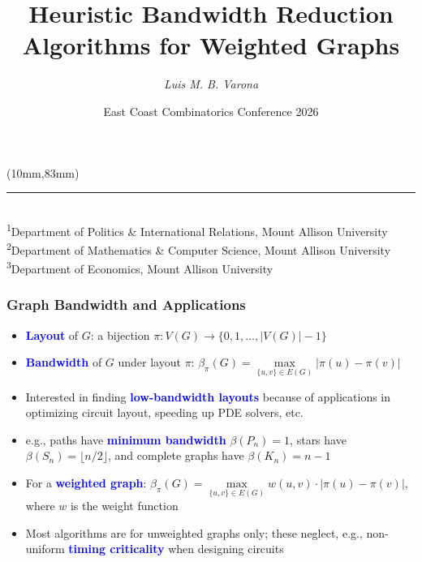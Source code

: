 \documentclass[xcolor=dvipsnames]{beamer} %
\title[Heuristics for Weighted Graph Bandwidth]{\textbf{Heuristic Bandwidth Reduction Algorithms for Weighted Graphs}}
\author[Luis M. B. Varona]{\emph{Luis M. B. Varona}\inst{1,2,3}}
\institute[MtA]{\small Joint Work with \emph{Alexander Matheson}\inst{2}}
\date[July 24, 2026]{East Coast Combinatorics Conference 2026}
\newenvironment{reference}[2]{%
  \begin{textblock*}{\textwidth}(#1,#2)
  \footnotesize\it\bgroup\color{DeepBlue}}{\egroup
\end{textblock*}}
\renewcommand{\emph}[1]{\textcolor{Blue}{\textbf{#1}}}
\begin{document}
{
    \begin{frame}
        \vspace*{-0.8cm}
        \titlepage
        \begin{reference}{10mm}{83mm}
            \rule{4cm}{0.5pt} \\
            \scriptsize
            \textsuperscript{1}Department of Politics \& International Relations, Mount Allison University \\
            \textsuperscript{2}Department of Mathematics \& Computer Science, Mount Allison University \\
            \textsuperscript{3}Department of Economics, Mount Allison University \par
        \end{reference}
    \end{frame}
}
\addtocounter{framenumber}{-1}	%

\begin{frame}
    \frametitle{\normalfont Graph Bandwidth and Applications}
    \begin{itemize}
        \item \emph{Layout} of $G$: a bijection $\pi : V(G) \to \bigl\{0, 1, \ldots, \bigl\lvert V(G) \bigr\rvert - 1\bigr\}$ \vfill
        \item \emph{Bandwidth} of $G$ under layout $\pi$: $\beta_{\pi}(G) = \max\limits_{\{u, v\} \in E(G)} \bigl\lvert \pi(u) - \pi(v) \bigr\rvert$ \vfill
        \item Interested in finding \emph{low-bandwidth layouts} because of applications in optimizing circuit layout, speeding up PDE solvers, etc. \vfill
        \item e.g., paths have \emph{minimum bandwidth} $\beta(P_n) = 1$, stars have $\beta(S_n) = \lfloor n / 2 \rfloor$, and complete graphs have $\beta(K_n) = n - 1$  \vfill
        \item For a \emph{weighted graph}: $\beta_{\pi}(G) = \max\limits_{\{u, v\} \in E(G)} w(u, v) \cdot \bigl\lvert \pi(u) - \pi(v) \bigr\rvert$, where $w$ is the weight function \vfill
        \item Most algorithms are for unweighted graphs only; these neglect, e.g., non-uniform \emph{timing criticality} when designing circuits \vfill
    \end{itemize}
\end{frame}
\end{document}
